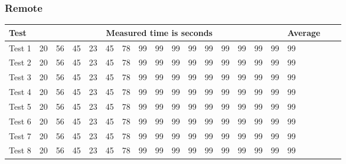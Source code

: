 \subsubsection{Remote}
\begin{center}
    \begin{tabular}{| l | l | l | l | l | l | l | l | l | l | l | l | l | l | l | l | l | l | l |}
    \hline
    Test & \multicolumn{15}{|c|}{Measured time is seconds} & Average \\ \hline
    Test 1 & 20 & 56 & 45 & 23 & 45 & 78 & 99 & 99 & 99 & 99 & 99 & 99 & 99 & 99 & 99 & 99 \\ \hline
    Test 2 & 20 & 56 & 45 & 23 & 45 & 78 & 99 & 99 & 99 & 99 & 99 & 99 & 99 & 99 & 99 & 99 \\ \hline
    Test 3 & 20 & 56 & 45 & 23 & 45 & 78 & 99 & 99 & 99 & 99 & 99 & 99 & 99 & 99 & 99 & 99 \\ \hline
    Test 4 & 20 & 56 & 45 & 23 & 45 & 78 & 99 & 99 & 99 & 99 & 99 & 99 & 99 & 99 & 99 & 99 \\ \hline
    Test 5 & 20 & 56 & 45 & 23 & 45 & 78 & 99 & 99 & 99 & 99 & 99 & 99 & 99 & 99 & 99 & 99 \\ \hline
    Test 6 & 20 & 56 & 45 & 23 & 45 & 78 & 99 & 99 & 99 & 99 & 99 & 99 & 99 & 99 & 99 & 99 \\ \hline
    Test 7 & 20 & 56 & 45 & 23 & 45 & 78 & 99 & 99 & 99 & 99 & 99 & 99 & 99 & 99 & 99 & 99 \\ \hline
    Test 8 & 20 & 56 & 45 & 23 & 45 & 78 & 99 & 99 & 99 & 99 & 99 & 99 & 99 & 99 & 99 & 99 \\ \hline
    \end{tabular}
\end{center}
